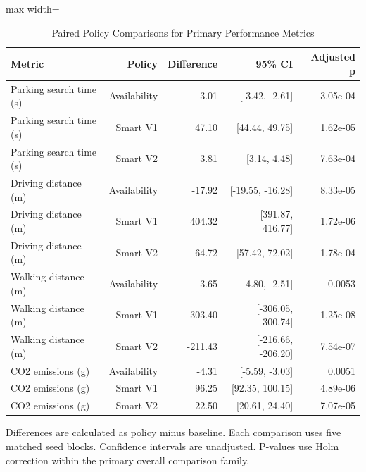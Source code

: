 \begin{table}[t]
\centering
\caption{Paired Policy Comparisons for Primary Performance Metrics}
\label{tab:primary_statistical_tests}
\small
\setlength{\tabcolsep}{4pt}
\begin{adjustbox}{max width=\textwidth}

\begin{tabular}{lrrrr}
\toprule
Metric & Policy & Difference & 95\% CI & Adjusted p\\
\midrule
Parking search time (s) & Availability & -3.01 & {}[-3.42, -2.61] & 3.05e-04\\
Parking search time (s) & Smart V1 & 47.10 & {}[44.44, 49.75] & 1.62e-05\\
Parking search time (s) & Smart V2 & 3.81 & {}[3.14, 4.48] & 7.63e-04\\
Driving distance (m) & Availability & -17.92 & {}[-19.55, -16.28] & 8.33e-05\\
Driving distance (m) & Smart V1 & 404.32 & {}[391.87, 416.77] & 1.72e-06\\
\addlinespace
Driving distance (m) & Smart V2 & 64.72 & {}[57.42, 72.02] & 1.78e-04\\
Walking distance (m) & Availability & -3.65 & {}[-4.80, -2.51] & 0.0053\\
Walking distance (m) & Smart V1 & -303.40 & {}[-306.05, -300.74] & 1.25e-08\\
Walking distance (m) & Smart V2 & -211.43 & {}[-216.66, -206.20] & 7.54e-07\\
CO2 emissions (g) & Availability & -4.31 & {}[-5.59, -3.03] & 0.0051\\
\addlinespace
CO2 emissions (g) & Smart V1 & 96.25 & {}[92.35, 100.15] & 4.89e-06\\
CO2 emissions (g) & Smart V2 & 22.50 & {}[20.61, 24.40] & 7.07e-05\\
\bottomrule
\end{tabular}
\end{adjustbox}
\par\smallskip
\begin{minipage}{\textwidth}
\footnotesize
Differences are calculated as policy minus baseline. Each comparison uses five matched seed blocks. Confidence intervals are unadjusted. P-values use Holm correction within the primary overall comparison family.
\end{minipage}
\end{table}
